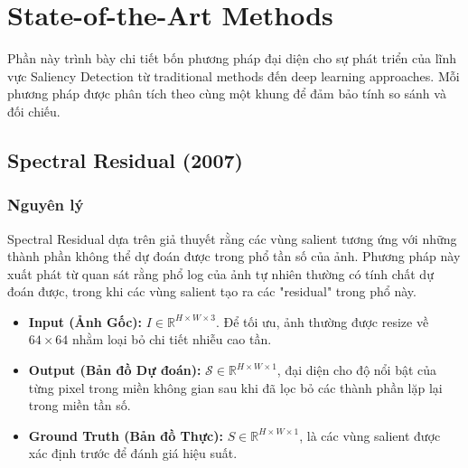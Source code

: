 \section{State-of-the-Art Methods}

Phần này trình bày chi tiết bốn phương pháp đại diện cho sự phát triển của lĩnh vực Saliency Detection từ traditional methods đến deep learning approaches. Mỗi phương pháp được phân tích theo cùng một khung để đảm bảo tính so sánh và đối chiếu.

\subsection{Spectral Residual (2007)}

\subsubsection{Nguyên lý}

Spectral Residual \cite{sr_2007} dựa trên giả thuyết rằng các vùng salient tương ứng với những thành phần không thể dự đoán được trong phổ tần số của ảnh. Phương pháp này xuất phát từ quan sát rằng phổ log của ảnh tự nhiên thường có tính chất dự đoán được, trong khi các vùng salient tạo ra các "residual" trong phổ này.

\begin{itemize}
    \item \textbf{Input (Ảnh Gốc):} $I \in \mathbb{R}^{H \times W \times 3}$. Để tối ưu, ảnh thường được resize về $64 \times 64$ nhằm loại bỏ chi tiết nhiễu cao tần.
    \item \textbf{Output (Bản đồ Dự đoán):} $\mathcal{S} \in \mathbb{R}^{H \times W \times 1}$, đại diện cho độ nổi bật của từng pixel trong miền không gian sau khi đã lọc bỏ các thành phần lặp lại trong miền tần số.
    \item \textbf{Ground Truth (Bản đồ Thực):} $S \in \mathbb{R}^{H \times W \times 1}$, là các vùng salient được xác định trước để đánh giá hiệu suất.
\end{itemize}

